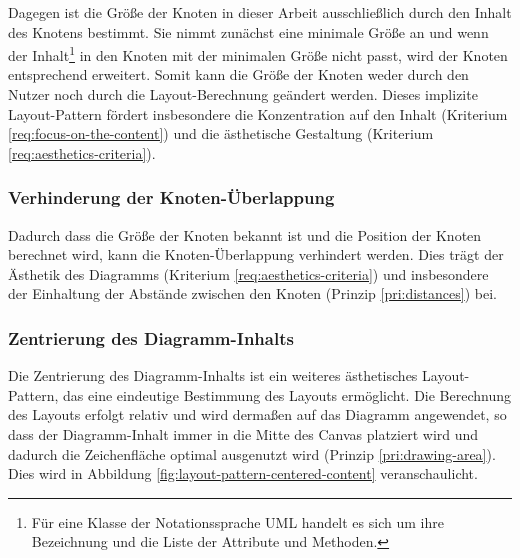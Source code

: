 Dagegen ist die Größe der Knoten in dieser Arbeit ausschließlich durch den Inhalt des Knotens bestimmt. Sie nimmt zunächst eine minimale Größe an und wenn der Inhalt\footnote{Für eine Klasse der Notationssprache UML handelt es sich um ihre Bezeichnung und die Liste der Attribute und Methoden.} in den Knoten mit der minimalen Größe nicht passt, wird der Knoten entsprechend erweitert. Somit kann die Größe der Knoten weder durch den Nutzer noch durch die Layout-Berechnung geändert werden. Dieses implizite Layout-Pattern fördert insbesondere die Konzentration auf den Inhalt (Kriterium \ref{req:focus-on-the-content}) und die ästhetische Gestaltung (Kriterium \ref{req:aesthetics-criteria}).

\subsubsection{Verhinderung der Knoten-Überlappung}
\label{subsubsec:prevention-of-node-overlap}

Dadurch dass die Größe der Knoten bekannt ist und die Position der Knoten berechnet wird, kann die Knoten-Überlappung verhindert werden. Dies trägt der Ästhetik des Diagramms (Kriterium \ref{req:aesthetics-criteria}) und insbesondere der Einhaltung der Abstände zwischen den Knoten (Prinzip \ref{pri:distances}) bei.

\subsubsection{Zentrierung des Diagramm-Inhalts}
\label{subsubsec:centering-of-diagram-content}

Die Zentrierung des Diagramm-Inhalts ist ein weiteres ästhetisches Layout-Pattern, das eine eindeutige Bestimmung des Layouts ermöglicht. Die Berechnung des Layouts erfolgt relativ und wird dermaßen auf das Diagramm angewendet, so dass der Diagramm-Inhalt immer in die Mitte des Canvas platziert wird und dadurch die Zeichenfläche optimal ausgenutzt wird (Prinzip \ref{pri:drawing-area}). Dies wird in Abbildung \ref{fig:layout-pattern-centered-content} veranschaulicht.

